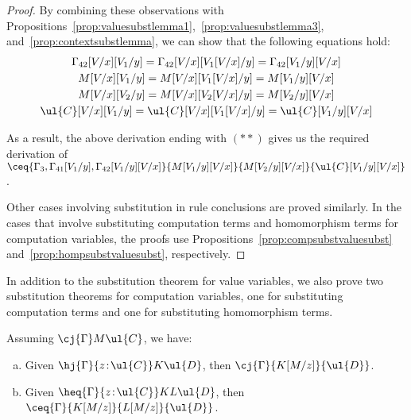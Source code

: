 \begin{proof}
By combining these observations with Propositions~\ref{prop:valuesubstlemma1},~\ref{prop:valuesubstlemma3}, and~\ref{prop:contextsubstlemma}, we can show that the following equations hold:
\[
\begin{array}{c}
\Gamma_{42}[V/x][V_1/y] = \Gamma_{42}[V/x][V_1[V/x]/y] = \Gamma_{42}[V_1/y][V/x]
\\[1mm]
M[V/x][V_1/y] = M[V/x][V_1[V/x]/y] = M[V_1/y][V/x]
\\[1mm]
M[V/x][V_2/y] = M[V/x][V_2[V/x]/y] = M[V_2/y][V/x]
\\[1mm]
\ul{C}[V/x][V_1/y] = \ul{C}[V/x][V_1[V/x]/y] = \ul{C}[V_1/y][V/x]
\end{array}
\]

As a result, the above derivation ending with $(**)$ gives us the required derivation of 
$
\ceq {\Gamma_3, \Gamma_{41}[V_1/y],\Gamma_{42}[V_1/y][V/x]} {M[V_1/y][V/x]} {M[V_2/y][V/x]} {\ul{C}[V_1/y][V/x]}
$.

Other cases involving substitution in rule conclusions are proved similarly. In the cases that involve substituting computation terms and homomorphism terms for computation variables, the proofs use Propositions~\ref{prop:compsubstvaluesubst} and~\ref{prop:hompsubstvaluesubst}, respectively.
\end{proof}

In addition to the substitution theorem for value variables, we also prove two substitution theorems for computation variables, one for substituting computation terms and one for substituting homomorphism terms.


\begin{theorem} 
\label{thm:compsubstitution}
Assuming $\cj {\Gamma} M {\ul{C}}$, we have:
\begin{enumerate}[(a)]
\item Given $\hj {\Gamma} {z \!:\! \ul{C}} K \ul{D}$, then $\cj {\Gamma} {K[M/z]} {\ul{D}}$.
\item Given $\heq {\Gamma} {z \!:\! \ul{C}} K L \ul{D}$, then $\ceq {\Gamma} {K[M/z]} {L[M/z]} {\ul{D}}$.
\end{enumerate}
\end{theorem}

